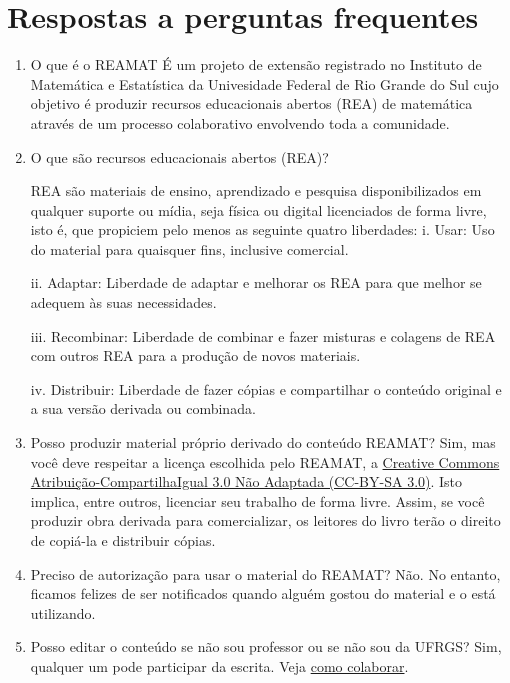 \documentclass[12pt]{report}
\begin{document}
\chapter*{Respostas a perguntas frequentes}
\begin{enumerate}
\item  O que é o REAMAT 
É um projeto de extensão registrado no Instituto de Matemática e Estatística da Univesidade Federal de Rio Grande do Sul cujo objetivo é produzir recursos educacionais abertos (REA) de matemática através de um processo colaborativo envolvendo toda a comunidade.  

\item O que são recursos educacionais abertos (REA)? 

REA são materiais de ensino, aprendizado e pesquisa disponibilizados em qualquer suporte ou mídia, seja física ou digital licenciados de forma livre, isto é, que propiciem pelo menos as seguinte quatro liberdades: 
\subitem i. Usar: Uso do material para quaisquer fins, inclusive comercial. 

\subitem ii. Adaptar: Liberdade de adaptar e melhorar os REA para que melhor se adequem às suas necessidades. 

\subitem iii. Recombinar: Liberdade de combinar e fazer misturas e colagens de REA com outros REA para a produção de novos materiais. 

\subitem iv. Distribuir: Liberdade de fazer cópias e compartilhar o conteúdo original e a sua versão derivada ou combinada. 

\item Posso produzir material próprio derivado do conteúdo REAMAT? 
Sim, mas você deve respeitar a licença escolhida pelo REAMAT, a \href{https://creativecommons.org/licenses/by-sa/3.0/}{Creative Commons Atribuição-CompartilhaIgual 3.0 Não Adaptada (CC-BY-SA 3.0)}. Isto implica, entre outros, licenciar seu trabalho de forma livre. Assim, se você produzir obra derivada para comercializar, os leitores do livro terão o direito de copiá-la e distribuir cópias. 

\item Preciso de autorização para usar o material do REAMAT? 
Não. No entanto, ficamos felizes de ser notificados quando alguém gostou do material e o está utilizando. 

\item Posso editar o conteúdo se não sou professor ou se não sou da UFRGS? 
Sim, qualquer um pode participar da escrita. Veja \href{https://www.ufrgs.br/reamat/participe.html}{como colaborar}. 


\end{enumerate}
\end{document}
